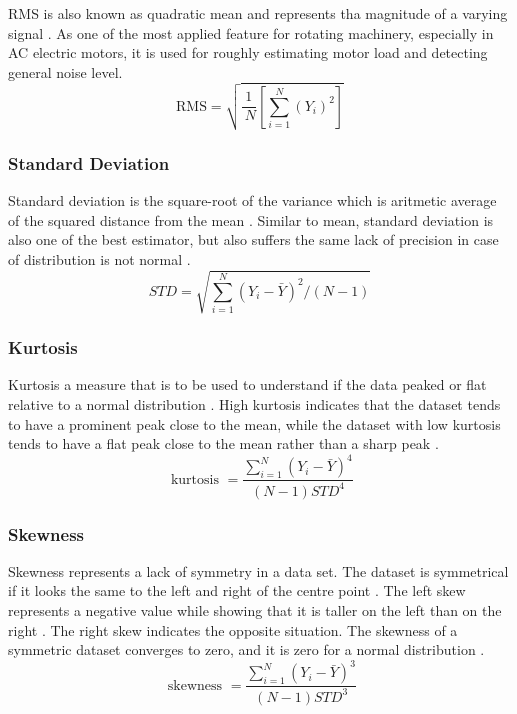 RMS is also known as quadratic mean and represents tha magnitude of a varying signal \cite{sait2011review,shukla2015analysis}. As one of the most applied feature for rotating machinery, especially in AC electric motors, it is used for roughly estimating motor load and detecting general noise level.
\begin{equation}
\text{RMS}=\sqrt{\frac{1}{{~N}}\left[\sum_{{i}=1}^{{N}}\left({Y}_{{i}}\right)^{2}\right]}	
\label{RMS}
\end{equation}
\subsubsection{Standard Deviation}

Standard deviation is the square-root of the variance which is aritmetic average of the squared distance from the mean \cite{shukla2015analysis}. Similar to mean, standard deviation is also one of the best estimator, but also suffers the same lack of precision in case of distribution is not normal \cite{croarkin2012handbook}.
\begin{equation}
STD=\sqrt{\sum_{i=1}^{N}\left(Y_{i}-\bar{Y}\right)^{2} /(N-1)}
\label{std}
\end{equation}

\subsubsection{Kurtosis} 

Kurtosis a measure that is to be used to understand if the data peaked or flat relative to a normal distribution \cite{shukla2015analysis}. High kurtosis indicates that the dataset tends to have a prominent peak close to the mean, while the dataset with low kurtosis tends to have a flat peak close to the mean rather than a sharp peak \cite{croarkin2012handbook}.
\begin{equation}
\text { kurtosis }=\frac{\sum_{i=1}^{N}\left(Y_{i}-\bar{Y}\right)^{4}}{(N-1) STD^{4}}
\label{kurtosis}
\end{equation}
\subsubsection{Skewness} 

Skewness represents a lack of symmetry in a data set. The dataset is symmetrical if it looks the same to the left and right of the centre point \cite{shukla2015analysis}. The left skew represents a negative value while showing that it is taller on the left than on the right \cite{croarkin2012handbook}. The right skew indicates the opposite situation. The skewness of a symmetric dataset converges to zero, and it is zero for a normal distribution \cite{croarkin2012handbook}.
\begin{equation}
\text { skewness }=\frac{\sum_{i=1}^{N}\left(Y_{i}-\bar{Y}\right)^{3}}{(N-1) STD^{3}}
\label{skewness}
\end{equation}
